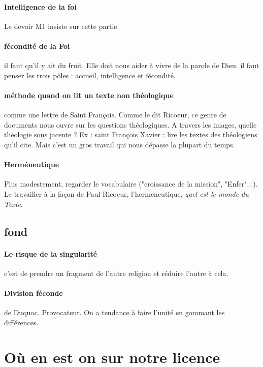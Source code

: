 \paragraph{Intelligence de la foi } Le devoir M1 insiste sur cette partie.
\paragraph{fécondité de la Foi} il faut qu'il y ait du fruit. Elle doit nous aider à vivre de la parole de Dieu. il faut penser les trois pôles : accueil, intelligence et fécondité.

\paragraph{méthode quand on lit un texte non théologique} comme une lettre de Saint François. Comme le dit Ricoeur, ce genre de documents nous ouvre sur les questions théologiques. A travers les images, quelle théologie sous jacente ? Ex : saint François Xavier : lire les textes des théologiens qu'il cite. Mais c'est un gros travail qui nous dépasse la plupart du temps. 

\paragraph{Herméneutique} Plus modestement, regarder le vocabulaire ("croissance de la mission", "Enfer"...). Le travailler à la façon de Paul Ricoeur, l'hermeneutique, \textit{quel est le monde du Texte}. 


\subsection{fond}

\paragraph{}
\paragraph{Le risque de la singularité} c'est de prendre un fragment de l'autre religion et réduire l'autre à cela.

\paragraph{Division féconde} de Duquoc. Provocateur. On a tendance à faire l'unité en gommant les différences.



\section{Où en est on sur notre licence}

